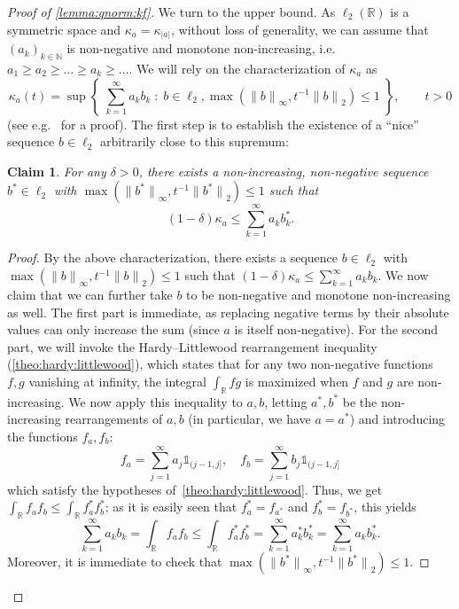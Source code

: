 \documentclass[11pt]{article}
\newtheorem{claim}[clm]{Claim}
\theoremstyle{remark}   	\newtheorem{remark}[theorem]{Remark}
\theoremstyle{definition}   	\newaliascnt{defn}{theorem}
\newenvironment{proofof}[1]{\begin{proof}[Proof of {#1}]}{\end{proof}}
\newcommand{\setOfSuchThat}[2]{ \left\{\; #1 \;\colon\; #2\; \right\} } 			\newcommand{\indicSet}[1]{\mathds{1}_{#1}}                                              \newcommand{\indic}[1]{\indicSet{\left\{#1\right\}}}                                             \newcommand{\disjunion}{\amalg}
\newcommand{\norm}[1]{\lVert#1{\rVert}}
\newcommand{\normtwo}[1]{{\norm{#1}}_2}
\newcommand{\norminf}[1]{{\norm{#1}}_\infty}
\newcommand{\abs}[1]{\left\lvert #1 \right\rvert}
\newcommand{\R}{\ensuremath{\mathbb{R}}\xspace}
\newcommand{\N}{\ensuremath{\mathbb{N}}\xspace}
\newcommand{\lp}[1][1]{\ell_{#1}}
\newcommand{\kf}[1]{\kappa_{#1}}
\begin{document}
\begin{proofof}{\autoref{lemma:qnorm:kf}}
  We turn to the upper bound. As $\lp[2](\R)$ is a symmetric space and $\kf{a}=\kf{\abs{a}}$, without loss of generality, we can assume that $(a_k)_{k\in\N}$ is non-negative and monotone non-increasing, i.e. $a_1\geq a_2\geq\dots\geq a_k \geq \dots$. We will rely on the characterization of $\kf{a}$ as
  \[
      \kf{a}(t) = \sup\setOfSuchThat{ \sum_{k=1}^\infty a_kb_k }{ b\in\lp[2], \max( \norminf{b}, t^{-1}\normtwo{b} ) \leq 1 }, \qquad t>0
  \]
  (see e.g.~\cite[Lemma 2.2]{Astashkin:2010} for a proof). The first step is to establish the existence of a ``nice'' sequence $b\in\lp[2]$ arbitrarily close to this supremum:
  \begin{claim}\label{claim:proof:lemma:qnorm:kf:1}
  For any $\delta > 0$, there exists a \emph{non-increasing}, non-negative sequence $b^\ast\in\lp[2]$ with $\max( \norminf{b^\ast}, t^{-1}\normtwo{b^\ast} ) \leq 1$ such that
  \[
      (1-\delta)\kf{a} \leq \sum_{k=1}^\infty a_kb^\ast_k.
  \]
  \end{claim}
  \begin{proof}
  By the above characterization, there exists a sequence $b\in\lp[2]$ with $\max( \norminf{b}, t^{-1}\normtwo{b} ) \leq 1$ such that
  $
  (1-\delta)\kf{a} \leq \sum_{k=1}^\infty a_kb_k.
  $
  We now claim that we can further take $b$ to be non-negative and monotone non-increasing as well. The first part is immediate, as replacing negative terms by their absolute values can only increase the sum (since $a$ is itself non-negative). For the second part, we will invoke the Hardy--Littlewood rearrangement inequality (\autoref{theo:hardy:littlewood}), which states that for any two non-negative functions $f,g$ vanishing at infinity, the integral $\int_{\R} fg$ is maximized when $f$ and $g$ are non-increasing. We now apply this inequality to $a,b$, letting $a^\ast,b^\ast$ be the non-increasing rearrangements of $a,b$ (in particular, we have $a=a^\ast$) and introducing the functions $f_a, f_b$:
  \[
      f_a = \sum_{j=1}^\infty a_j \indicSet{(j-1,j]},\quad f_b = \sum_{j=1}^\infty b_j \indicSet{(j-1,j]}
  \]
  which satisfy the hypotheses of~\autoref{theo:hardy:littlewood}. Thus, we get $\int_{\R} f_a f_b \leq \int_{\R} f_a^\ast f_b^\ast$; as it is easily seen that $f_a^\ast=f_{a^\ast}$ and $f_b^\ast=f_{b^\ast}$, this yields
  \[
    \sum_{k=1}^\infty a_kb_k = \int_{\R} f_a f_b \leq \int_{\R} f_a^\ast f_b^\ast = \sum_{k=1}^\infty a^\ast_kb^\ast_k= \sum_{k=1}^\infty a_kb^\ast_k.
  \]
  Moreover, it is immediate to check that $\max( \norminf{b^\ast}, t^{-1}\normtwo{b^\ast} ) \leq 1$.
  \end{proof}
  

\end{proofof}
\end{document}
